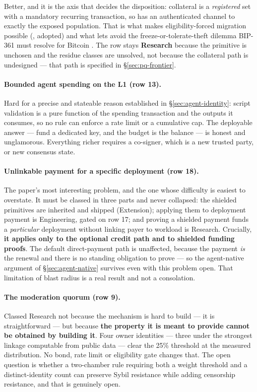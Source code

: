 Better, and it is the axis that decides the disposition: collateral is a \emph{registered} set with a
mandatory recurring transaction, so \Flux{} has an authenticated channel to exactly the exposed
population. That is what makes eligibility-forced migration possible
(, adopted) and what lets \Flux{} avoid the freeze-or-tolerate-theft dilemma
BIP-361 must resolve for Bitcoin \citep{bip361}. The row stays \textbf{Research} because the
primitive is unchosen and the residue classes are unsolved, not because the collateral path is
undesigned --- that path is specified in \S\ref{sec:pq-frontier}.

\paragraph{Bounded agent spending on the \Flux L1 (row 13).}
Hard for a precise and stateable reason established in \S\ref{sec:agent-identity}: script validation
is a pure function of the spending transaction and the outputs it consumes, so no rule can enforce a
rate limit or a cumulative cap. The deployable answer --- fund a dedicated key, and the budget is the
balance --- is honest and unglamorous. Everything richer requires a co-signer, which is a new trusted
party, or new consensus state.

\paragraph{Unlinkable payment for a specific deployment (row 18).}
The paper's most interesting problem, and the one whose difficulty is easiest to overstate. It must
be classed in three parts and never collapsed: the shielded primitives are inherited and shipped
(Extension); applying them to deployment payment is Engineering, gated on row 17; and proving a
shielded payment funds a \emph{particular} deployment without linking payer to workload is Research.
Crucially, \textbf{it applies only to the optional credit path and to shielded funding proofs}. The
default direct-payment path is unaffected, because the payment \emph{is} the renewal and there is no
standing obligation to prove --- so the agent-native argument of \S\ref{sec:agent-native} survives
even with this problem open. That limitation of blast radius is a real result and not a consolation.

\paragraph{The moderation quorum (row 9).}
Classed Research not because the mechanism is hard to build --- it is straightforward --- but because
\textbf{the property it is meant to provide cannot be obtained by building it}. Four owner identities
--- three under the strongest linkage computable from public data --- clear the 25\% threshold at the
measured distribution. No bond, rate limit or eligibility gate changes
that. The open question is whether a two-chamber rule requiring both a weight threshold and a
distinct-identity count can preserve Sybil resistance while adding censorship resistance, and that is
genuinely open.

